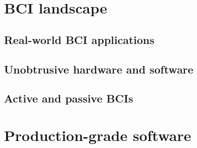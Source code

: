 \section{BCI landscape}
\label{chapter2-research-landscape}


\subsection{Real-world BCI applications}
\label{chapter2-real-world-bci-applications}






\subsection{Unobtrusive hardware and software}
\label{chapter2-unobtrusive-hardware-and-software}


\subsection{Active and passive BCIs}
\label{chapter2-active-and-passive-bcis}


\section{Production-grade software}
\label{chapter2-production-grade-software}

